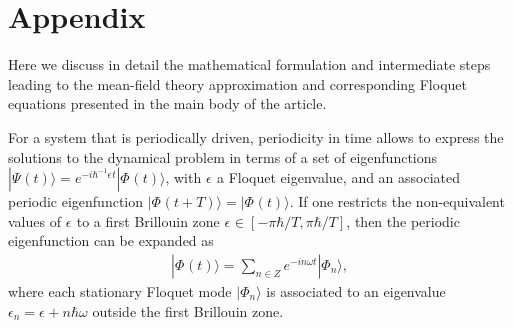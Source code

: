\documentclass[aps,twocolumn,showpacs,floatfix,prl]{revtex4}
\begin{document}
\section{Appendix} \label{suppl} 




Here we discuss in detail the mathematical formulation and intermediate steps leading to
the mean-field theory approximation and corresponding Floquet equations presented in the main body of the article.


For a system that is periodically driven, periodicity in time allows to express the solutions to the dynamical problem
in terms of a set of eigenfunctions $|\Psi_{}(t)\rangle = e^{-i\hbar^{-1}\epsilon_{}t}|\Phi_{}(t)\rangle$, with
$\epsilon_{}$ a Floquet eigenvalue, and an associated periodic eigenfunction $|\Phi_{}(t + T)\rangle = |\Phi_{}(t)\rangle$.
If one restricts the non-equivalent values of $\epsilon_{}$ to a first Brillouin zone $\epsilon_{} \in \left[-\pi\hbar/T, \pi\hbar/T \right]$,
then the periodic eigenfunction can be expanded as
\begin{eqnarray}
|\Phi_{}(t)\rangle = \sum_{n\in Z}e^{-i n \omega t} |\Phi_{n}^{}\rangle,
\label{eq1}
\end{eqnarray} 
where each stationary Floquet mode $|\Phi_{n}^{}\rangle$ is associated to an eigenvalue $\epsilon_{n} = \epsilon_{} + n\hbar\omega$
outside the first Brillouin zone.
\end{document}
